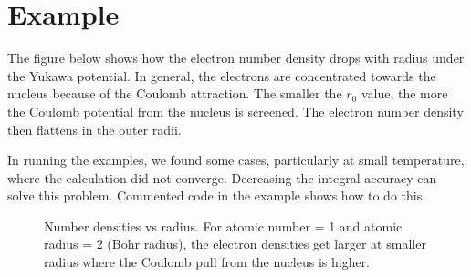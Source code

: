 \documentclass[pdftex]{article}    %
\begin{document}
\section{Example}

The figure below shows how the electron number density drops with 
radius under the Yukawa potential.  In general, the electrons are concentrated
towards the nucleus because of the Coulomb attraction.
The smaller the $r_0$ value, the more
the Coulomb potential from the nucleus is screened.  The electron number
density then flattens in the outer radii.

In running the examples, we found some cases, particularly at small temperature,
where the calculation did not converge.  Decreasing the integral accuracy
can solve this problem.  Commented code in the example shows how to do this.

\begin{figure}[htp]
\centering
{}
\caption{Number densities vs radius. For atomic number = 1 and atomic radius
  = 2 (Bohr radius), the electron densities get larger at smaller radius where
the Coulomb pull from the nucleus is higher.} 
\label{fig:n_r}
\end{figure}
\end{document}
